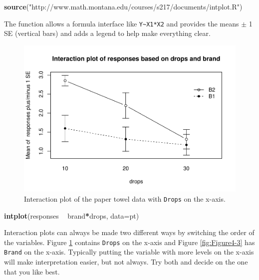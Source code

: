 \documentclass[]{book}
\newenvironment{Shaded}{\begin{snugshade}}{\end{snugshade}}
\newcommand{\KeywordTok}[1]{\textcolor[rgb]{0.13,0.29,0.53}{\textbf{#1}}}
\newcommand{\DataTypeTok}[1]{\textcolor[rgb]{0.13,0.29,0.53}{#1}}
\newcommand{\StringTok}[1]{\textcolor[rgb]{0.31,0.60,0.02}{#1}}
\newcommand{\OperatorTok}[1]{\textcolor[rgb]{0.81,0.36,0.00}{\textbf{#1}}}
\newcommand{\NormalTok}[1]{#1}
\theoremstyle{definition}
\theoremstyle{definition}
\theoremstyle{remark}
\begin{document}
\begin{Shaded}
\begin{Highlighting}[]
\KeywordTok{source}\NormalTok{(}\StringTok{"http://www.math.montana.edu/courses/s217/documents/intplot.R"}\NormalTok{)}
\end{Highlighting}
\end{Shaded}

The function allows a formula interface like
\texttt{Y\textasciitilde{}X1*X2} and provides the means \(\pm\) 1 SE
(vertical bars) and adds a legend to help make everything clear.




\begin{figure}
\centering
\includegraphics{04-twoWayAnova_files/figure-latex/Figure4-2-1.pdf}
\caption{\label{fig:Figure4-2}Interaction plot of the paper towel data with
\texttt{Drops} on the x-axis.}
\end{figure}

\begin{Shaded}
\begin{Highlighting}[]
\KeywordTok{intplot}\NormalTok{(responses }\OperatorTok{~}\StringTok{ }\NormalTok{brand}\OperatorTok{*}\NormalTok{drops, }\DataTypeTok{data=}\NormalTok{pt)}
\end{Highlighting}
\end{Shaded}

Interaction plots can always be made two different ways by switching the
order of the variables. Figure \ref{fig:Figure4-2} contains
\texttt{Drops} on the x-axis and Figure \ref{fig:Figure4-3} has
\texttt{Brand} on the x-axis. Typically putting the variable with more
levels on the x-axis will make interpretation easier, but not always.
Try both and decide on the one that you like best.
\end{document}
